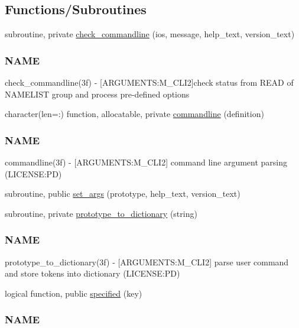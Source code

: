 \subsection*{Functions/\+Subroutines}
\begin{DoxyCompactItemize}
\item 
subroutine, private \mbox{\hyperlink{namespacem__cli2_a02d4639b325d1b8c6fd3b03ba515f2b3}{check\+\_\+commandline}} (ios, message, help\+\_\+text, version\+\_\+text)
\begin{DoxyCompactList}\small\item\em \subsubsection*{N\+A\+ME}

check\+\_\+commandline(3f) -\/ \mbox{[}A\+R\+G\+U\+M\+E\+N\+TS\+:M\+\_\+\+C\+L\+I2\mbox{]}check status from R\+E\+AD of N\+A\+M\+E\+L\+I\+ST group and process pre-\/defined options \end{DoxyCompactList}\item 
character(len=\+:) function, allocatable, private \mbox{\hyperlink{namespacem__cli2_a85c38a938a7dd9a749daf8effe45c109}{commandline}} (definition)
\begin{DoxyCompactList}\small\item\em \subsubsection*{N\+A\+ME}

commandline(3f) -\/ \mbox{[}A\+R\+G\+U\+M\+E\+N\+TS\+:M\+\_\+\+C\+L\+I2\mbox{]} command line argument parsing (L\+I\+C\+E\+N\+SE\+:PD) \end{DoxyCompactList}\item 
subroutine, public \mbox{\hyperlink{namespacem__cli2_a6d20994aa80217dd3d0ffd1d5586f736}{set\+\_\+args}} (prototype, help\+\_\+text, version\+\_\+text)
\item 
subroutine, private \mbox{\hyperlink{namespacem__cli2_a14896d00e509cbc32f4df993a8d6f75b}{prototype\+\_\+to\+\_\+dictionary}} (string)
\begin{DoxyCompactList}\small\item\em \subsubsection*{N\+A\+ME}

prototype\+\_\+to\+\_\+dictionary(3f) -\/ \mbox{[}A\+R\+G\+U\+M\+E\+N\+TS\+:M\+\_\+\+C\+L\+I2\mbox{]} parse user command and store tokens into dictionary (L\+I\+C\+E\+N\+SE\+:PD) \end{DoxyCompactList}\item 
logical function, public \mbox{\hyperlink{namespacem__cli2_a2b85feed10ad5507a7181c5434c46541}{specified}} (key)
\begin{DoxyCompactList}\small\item\em \subsubsection*{N\+A\+ME}


\end{DoxyCompactList}
\end{DoxyCompactItemize}
